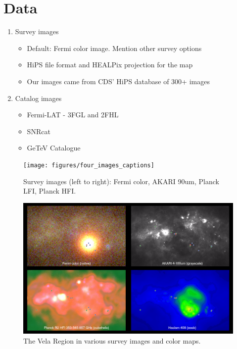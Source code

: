 \section{Data}


\begin{enumerate}
\item Survey images

  \begin{itemize}

  \item Default: Fermi color image. Mention other survey options

  \item HiPS file format and HEALPix projection for the map

  \item Our images came from CDS' HiPS database of 300+ images

  \end{itemize}


\item Catalog images

  \begin{itemize}

  \item Fermi-LAT - 3FGL and 2FHL

  \item SNRcat

  \item GeTeV Catalogue

  \end{itemize}
\end{enumerate}


\begin{figure}[h]
  \centerline{\texttt{[image: figures/four\_images\_captions]}}
  \caption{Survey images (left to right): Fermi color, AKARI 90um, Planck LFI, Planck HFI.}
\end{figure}

\begin{figure}[h]
  \centerline{\includegraphics[width=\textwidth]{figures/vela_region_captions}}
  \caption{The Vela Region in various survey images and color maps.}
\end{figure}






